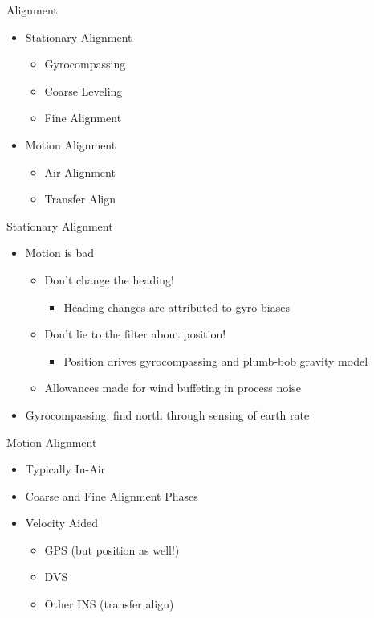 \begin{frame}
Alignment
 \begin{itemize}
 \item Stationary Alignment
	\begin{itemize}
		\item Gyrocompassing
		\item Coarse Leveling
		\item Fine Alignment
	\end{itemize}
 \item Motion Alignment
	\begin{itemize}
		\item Air Alignment
		\item Transfer Align
	\end{itemize}
\end{itemize}
\end{frame}

\begin{frame}
Stationary Alignment
\begin{itemize}
  \item Motion is bad
	\begin{itemize}
		\item Don't change the heading!
		\begin{itemize}
		\item Heading changes are attributed to gyro biases
		\end{itemize}
		\item Don't lie to the filter about position!
		\begin{itemize}
			\item Position drives gyrocompassing and plumb-bob gravity model
		\end{itemize}
  \item Allowances made for wind buffeting in process noise
	\end{itemize}
  \item Gyrocompassing: find north through sensing of earth rate
\end{itemize} 
\end{frame}

\begin{frame}
Motion Alignment
\begin{itemize}
  \item Typically In-Air
  \item Coarse and Fine Alignment Phases
  \item Velocity Aided
	\begin{itemize}
		\item GPS (but position as well!)
		\item DVS
		\item Other INS (transfer align)
	\end{itemize}
\end{itemize} 
\end{frame}
